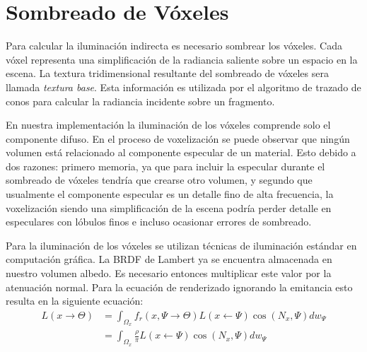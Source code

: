 \section{Sombreado de Vóxeles} %
\label{sec:sombreado_de_voxeles_impl}
Para calcular la iluminación indirecta es necesario sombrear los vóxeles. Cada vóxel representa una simplificación de la radiancia saliente sobre un espacio en la escena. La textura tridimensional resultante del sombreado de vóxeles sera llamada \emph{textura base}. Esta información es utilizada por el algoritmo de trazado de conos para calcular la radiancia incidente sobre un fragmento.

En nuestra implementación la iluminación de los vóxeles comprende solo el componente difuso. En el proceso de voxelización se puede observar que ningún volumen está relacionado al componente especular de un material. Esto debido a dos razones: primero memoria, ya que para incluir la especular durante el sombreado de vóxeles tendría que crearse otro volumen, y segundo que usualmente el componente especular es un detalle fino de alta frecuencia, la voxelización siendo una simplificación de la escena podría perder detalle en especulares con lóbulos finos e incluso ocasionar errores de sombreado.

Para la iluminación de los vóxeles se utilizan técnicas de iluminación estándar en computación gráfica. La \ac{BRDF} de Lambert ya se encuentra almacenada en nuestro volumen albedo. Es necesario entonces multiplicar este valor por la atenuación normal. Para la ecuación de renderizado ignorando la emitancia esto resulta en la siguiente ecuación:
\begin{equation}
	\begin{split}
		L(x\to\Theta) &= \int_{\Omega_{x}}{f_{r}(x, \Psi\to\Theta)L(x\gets\Psi)\cos(N_{x}, \Psi)dw_{\Psi}}\\
		&= \int_{\Omega_{x}}{\frac{\rho}{\pi}L(x\gets\Psi)\cos(N_{x}, \Psi)dw_{\Psi}}
	\end{split}
	\label{eq:shading_voxels}
\end{equation}

